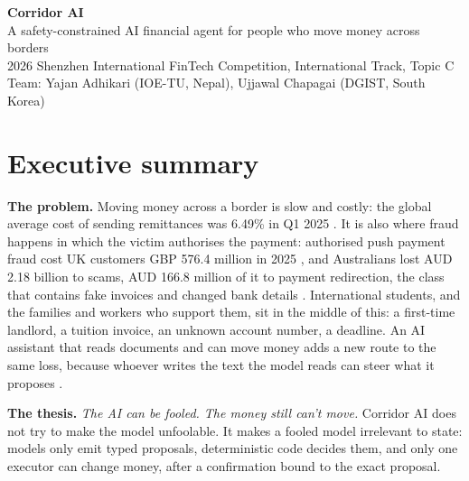 \documentclass[11pt,a4paper]{article}
\begin{document}
\begin{center}
{\LARGE\bfseries Corridor AI}\\[3pt]
{\large A safety-constrained AI financial agent for people who move money across borders}\\[8pt]
{\small 2026 Shenzhen International FinTech Competition, International Track, Topic C\\
Team: Yajan Adhikari (IOE-TU, Nepal), Ujjawal Chapagai (DGIST, South Korea)}
\end{center}
\vspace{-4pt}

\section{Executive summary}
\textbf{The problem.} Moving money across a border is slow and costly: the global average cost of sending remittances was 6.49\% in Q1 2025 \cite{worldbank_rpw50}. It is also where fraud happens in which the victim authorises the payment: authorised push payment fraud cost UK customers GBP 576.4 million in 2025 \cite{ukfinance2026fraud}, and Australians lost AUD 2.18 billion to scams, AUD 166.8 million of it to payment redirection, the class that contains fake invoices and changed bank details \cite{accc2026targeting}. International students, and the families and workers who support them, sit in the middle of this: a first-time landlord, a tuition invoice, an unknown account number, a deadline. An AI assistant that reads documents and can move money adds a new route to the same loss, because whoever writes the text the model reads can steer what it proposes \cite{greshake2023indirect,perez2022ignore,debenedetti2024agentdojo}.

\textbf{The thesis.} \emph{The AI can be fooled. The money still can't move.} Corridor AI does not try to make the model unfoolable. It makes a fooled model irrelevant to state: models only emit typed proposals, deterministic code decides them, and only one executor can change money, after a confirmation bound to the exact proposal.
\end{document}
